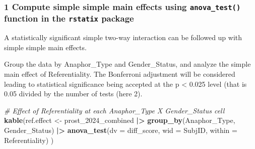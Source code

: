 \documentclass[
  10pt,
]{article}
\newenvironment{Shaded}{\begin{snugshade}}{\end{snugshade}}
\newcommand{\AttributeTok}[1]{\textcolor[rgb]{0.13,0.29,0.53}{#1}}
\newcommand{\CommentTok}[1]{\textcolor[rgb]{0.56,0.35,0.01}{\textit{#1}}}
\newcommand{\FunctionTok}[1]{\textcolor[rgb]{0.13,0.29,0.53}{\textbf{#1}}}
\newcommand{\NormalTok}[1]{#1}
\newcommand{\OtherTok}[1]{\textcolor[rgb]{0.56,0.35,0.01}{#1}}
\newcommand{\SpecialCharTok}[1]{\textcolor[rgb]{0.81,0.36,0.00}{\textbf{#1}}}
\begin{document}
\subsubsection{\texorpdfstring{1 Compute simple simple main effects
using \texttt{anova\_test()} function in the \texttt{rstatix}
package}{1 Compute simple simple main effects using anova\_test() function in the rstatix package}}\label{compute-simple-simple-main-effects-using-anova_test-function-in-the-rstatix-package}

A statistically significant simple two-way interaction can be followed
up with simple simple main effects.

Group the data by Anaphor\_Type and Gender\_Status, and analyze the
simple main effect of Referentiality. The Bonferroni adjustment will be
considered leading to statistical significance being accepted at the p
\textless{} 0.025 level (that is 0.05 divided by the number of tests
(here 2).

\begin{Shaded}
\begin{Highlighting}[]
\CommentTok{\# Effect of Referentiality at each Anaphor\_Type X Gender\_Status cell}
\FunctionTok{kable}\NormalTok{(ref.effect }\OtherTok{\textless{}{-}}\NormalTok{ prost\_2024\_combined }\SpecialCharTok{|\textgreater{}}
  \FunctionTok{group\_by}\NormalTok{(Anaphor\_Type, Gender\_Status) }\SpecialCharTok{|\textgreater{}}
  \FunctionTok{anova\_test}\NormalTok{(}\AttributeTok{dv =}\NormalTok{ diff\_score, }\AttributeTok{wid =}\NormalTok{ SubjID, }\AttributeTok{within =}\NormalTok{ Referentiality) )}
\end{Highlighting}
\end{Shaded}
\end{document}
